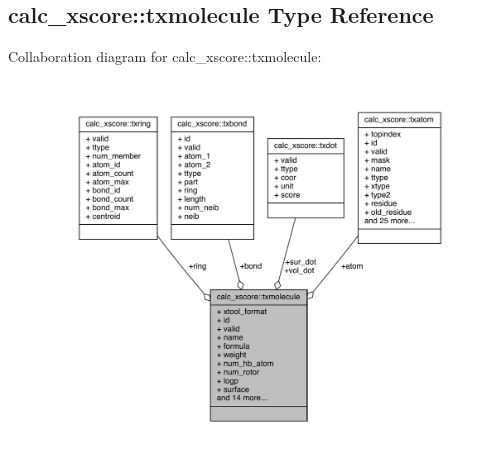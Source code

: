 \hypertarget{structcalc__xscore_1_1txmolecule}{\subsection{calc\-\_\-xscore\-:\-:txmolecule Type Reference}
\label{structcalc__xscore_1_1txmolecule}
}


Collaboration diagram for calc\-\_\-xscore\-:\-:txmolecule\-:
\nopagebreak
\begin{figure}[H]
\begin{center}
\leavevmode
\includegraphics[width=350pt]{structcalc__xscore_1_1txmolecule__coll__graph}
\end{center}
\end{figure}

